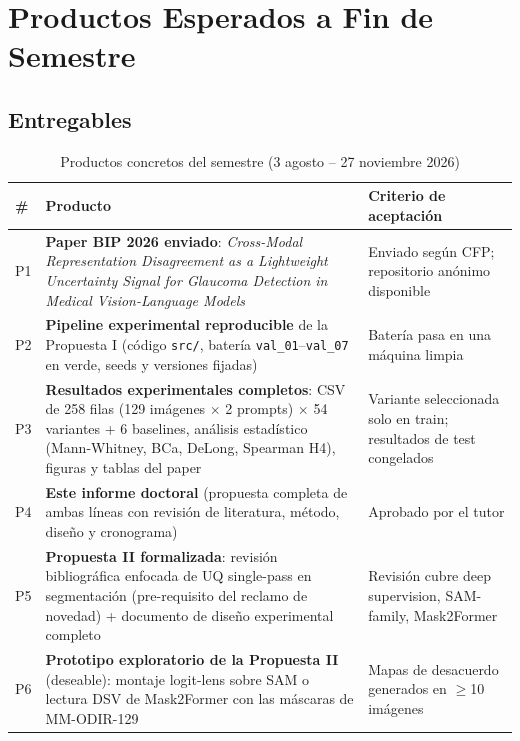 \documentclass[12pt,a4paper]{article}
\begin{document}
\section{Productos Esperados a Fin de Semestre}
\label{sec:productos}

\subsection{Entregables}

\begin{table}[H]
\centering
\caption{Productos concretos del semestre (3 agosto -- 27 noviembre 2026)}
\label{tab:productos}
\begin{tabularx}{\textwidth}{lXl}
\toprule
\textbf{\#} & \textbf{Producto} & \textbf{Criterio de aceptación} \\
\midrule
P1 & \textbf{Paper BIP 2026 enviado}: \textit{Cross-Modal Representation Disagreement as a Lightweight Uncertainty Signal for Glaucoma Detection in Medical Vision-Language Models} & Enviado según CFP; repositorio anónimo disponible \\
P2 & \textbf{Pipeline experimental reproducible} de la Propuesta I (código \texttt{src/}, batería \texttt{val\_01}--\texttt{val\_07} en verde, seeds y versiones fijadas) & Batería pasa en una máquina limpia \\
P3 & \textbf{Resultados experimentales completos}: CSV de 258 filas (129 imágenes $\times$ 2 prompts) $\times$ 54 variantes + 6 baselines, análisis estadístico (Mann-Whitney, BCa, DeLong, Spearman H4), figuras y tablas del paper & Variante seleccionada solo en train; resultados de test congelados \\
P4 & \textbf{Este informe doctoral} (propuesta completa de ambas líneas con revisión de literatura, método, diseño y cronograma) & Aprobado por el tutor \\
P5 & \textbf{Propuesta II formalizada}: revisión bibliográfica enfocada de UQ single-pass en segmentación (pre-requisito del reclamo de novedad) + documento de diseño experimental completo & Revisión cubre deep supervision, SAM-family, Mask2Former \\
P6 & \textbf{Prototipo exploratorio de la Propuesta II} (deseable): montaje logit-lens sobre SAM o lectura DSV de Mask2Former con las máscaras de MM-ODIR-129 & Mapas de desacuerdo generados en $\geq$10 imágenes \\
\bottomrule
\end{tabularx}
\end{table}
\end{document}

